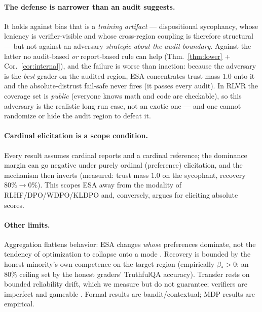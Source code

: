 \documentclass[11pt]{article}
\theoremstyle{definition}\newtheorem{definition}{Definition}
\theoremstyle{definition}\newtheorem{assumption}{Assumption}
\begin{document}
\paragraph{The defense is narrower than an audit suggests.} It holds against bias that is a
\emph{training artifact} --- dispositional sycophancy, whose leniency is verifier-visible and whose
cross-region coupling is therefore structural --- but not against an adversary \emph{strategic about
the audit boundary}. Against the latter no audit-based \emph{or} report-based rule can help
(Thm.~\ref{thm:lower} + Cor.~\ref{cor:internal}), and the failure is worse than inaction: because the
adversary is the \emph{best} grader on the audited region, ESA concentrates trust mass $1.0$ onto it
and the absolute-distrust fail-safe never fires (it passes every audit). In RLVR the coverage set is
\emph{public} (everyone knows math and code are checkable), so this adversary is the realistic
long-run case, not an exotic one --- and one cannot randomize or hide the audit region to defeat it.

\paragraph{Cardinal elicitation is a scope condition.} Every result assumes cardinal reports and a
cardinal reference; the dominance margin can go negative under purely ordinal (preference) elicitation,
and the mechanism then inverts (measured: trust mass $1.0$ on the sycophant, recovery $80\%\!\to\!0\%$).
This scopes ESA away from the modality of RLHF/DPO/WDPO/KLDPO and, conversely, argues for eliciting
absolute scores.

\paragraph{Other limits.} Aggregation flattens behavior: ESA changes \emph{whose} preferences dominate,
not the tendency of optimization to collapse onto a mode \citep[cf.][]{gao2023overopt}. Recovery is
bounded by the honest minority's own competence on the target region (empirically $\beta_\ast>0$: an
$80\%$ ceiling set by the honest graders' TruthfulQA accuracy). Transfer rests on bounded reliability
drift, which we measure but do not guarantee; verifiers are imperfect and gameable
\citep{skalse2022reward}. Formal results are bandit/contextual; MDP results are empirical.

\end{document}
